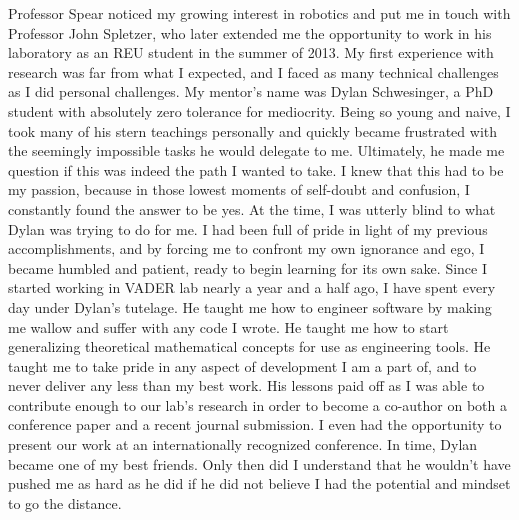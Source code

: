 \documentclass[12pt]{article}
\begin{document}
Professor Spear noticed my growing interest in robotics and put me in touch
with Professor John Spletzer, who later extended me the opportunity to work in
his laboratory as an REU student in the summer of 2013. My first experience
with research was far from what I expected, and I faced as many technical
challenges as I did personal challenges.  My mentor's name was Dylan
Schwesinger, a PhD student with absolutely zero tolerance for mediocrity.
Being so young and naive, I took many of his stern teachings personally and
quickly became frustrated with the seemingly impossible tasks he would delegate
to me. Ultimately, he made me question if this was indeed the path I wanted to
take.  I knew that this had to be my passion, because in those lowest moments
of self-doubt and confusion, I constantly found the answer to be yes. At the
time, I was utterly blind to what Dylan was trying to do for me. I had been
full of pride in light of my previous accomplishments, and by forcing me to
confront my own ignorance and ego, I became humbled and patient, ready to begin
learning for its own sake. Since I started working in VADER lab nearly a year
and a half ago, I have spent every day under Dylan's tutelage.  He taught me
how to engineer software by making me wallow and suffer with any code I wrote.
He taught me how to start generalizing theoretical mathematical concepts for
use as engineering tools. He taught me to take pride in any aspect of
development I am a part of, and to never deliver any less than my best work.
His lessons paid off as I was able to contribute enough to our lab's research
in order to become a co-author on both a conference paper and a recent
journal submission. I even had the opportunity to present our work at an
internationally recognized conference. In time, Dylan became one of my best
friends. Only then did I understand that he wouldn't have pushed me as hard as
he did if he did not believe I had the potential and mindset to go the
distance.
\end{document}
